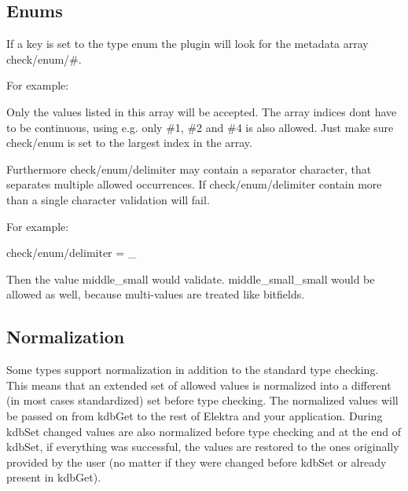 \subsection*{Enums}

If a key is set to the type {\ttfamily enum} the plugin will look for the metadata array {\ttfamily check/enum/\#}.

For example\+:




Only the values listed in this array will be accepted. The array indices don\textquotesingle{}t have to be continuous, using e.\+g. only {\ttfamily \#1}, {\ttfamily \#2} and {\ttfamily \#4} is also allowed. Just make sure {\ttfamily check/enum} is set to the largest index in the array.

Furthermore {\ttfamily check/enum/delimiter} may contain a separator character, that separates multiple allowed occurrences. If {\ttfamily check/enum/delimiter} contain more than a single character validation will fail.

For example\+:


\begin{DoxyCode}
check/enum/delimiter = \_
\end{DoxyCode}


Then the value {\ttfamily middle\+\_\+small} would validate. {\ttfamily middle\+\_\+small\+\_\+small} would be allowed as well, because multi-\/values are treated like bitfields.

\subsection*{Normalization}

Some types support normalization in addition to the standard type checking. This means that an extended set of allowed values is normalized into a different (in most cases standardized) set before type checking. The normalized values will be passed on from {\ttfamily kdb\+Get} to the rest of Elektra and your application. During {\ttfamily kdb\+Set} changed values are also normalized before type checking and at the end of {\ttfamily kdb\+Set}, if everything was successful, the values are restored to the ones originally provided by the user (no matter if they were changed before {\ttfamily kdb\+Set} or already present in {\ttfamily kdb\+Get}).

